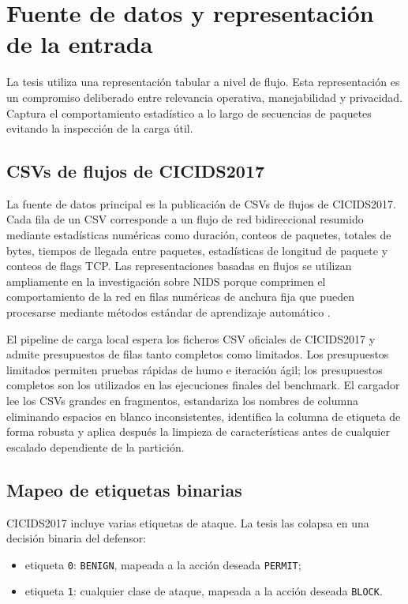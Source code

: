 \section{Fuente de datos y representación de la entrada}
La tesis utiliza una representación tabular a nivel de flujo. Esta representación es un compromiso deliberado entre relevancia operativa, manejabilidad y privacidad. Captura el comportamiento estadístico a lo largo de secuencias de paquetes evitando la inspección de la carga útil.

\subsection{CSVs de flujos de CICIDS2017}
La fuente de datos principal es la publicación de CSVs de flujos de CICIDS2017. Cada fila de un CSV corresponde a un flujo de red bidireccional resumido mediante estadísticas numéricas como duración, conteos de paquetes, totales de bytes, tiempos de llegada entre paquetes, estadísticas de longitud de paquete y conteos de flags TCP. Las representaciones basadas en flujos se utilizan ampliamente en la investigación sobre NIDS porque comprimen el comportamiento de la red en filas numéricas de anchura fija que pueden procesarse mediante métodos estándar de aprendizaje automático \parencite{Sperotto2010FlowIDS,Umer2017FlowIDS}.

El pipeline de carga local espera los ficheros CSV oficiales de CICIDS2017 y admite presupuestos de filas tanto completos como limitados. Los presupuestos limitados permiten pruebas rápidas de humo e iteración ágil; los presupuestos completos son los utilizados en las ejecuciones finales del benchmark. El cargador lee los CSVs grandes en fragmentos, estandariza los nombres de columna eliminando espacios en blanco inconsistentes, identifica la columna de etiqueta de forma robusta y aplica después la limpieza de características antes de cualquier escalado dependiente de la partición.

\subsection{Mapeo de etiquetas binarias}
CICIDS2017 incluye varias etiquetas de ataque. La tesis las colapsa en una decisión binaria del defensor:
\begin{itemize}
    \item etiqueta \texttt{0}: \texttt{BENIGN}, mapeada a la acción deseada \texttt{PERMIT};
    \item etiqueta \texttt{1}: cualquier clase de ataque, mapeada a la acción deseada \texttt{BLOCK}.
\end{itemize}

